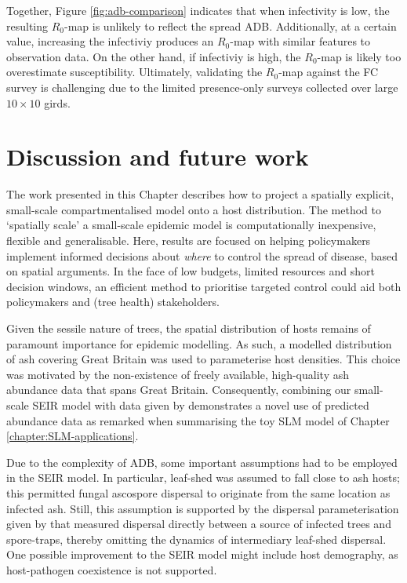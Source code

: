 Together, Figure \ref{fig:adb-comparison} indicates that when infectivity is low, the resulting $R_0$-map is unlikely to reflect the spread ADB. Additionally, at a certain value, increasing the infectiviy produces an $R_0$-map with similar features to observation data. On the other hand, if infectiviy is high, the $R_0$-map is likely too overestimate susceptibility. Ultimately, validating the $R_0$-map against the FC survey is challenging due to the limited presence-only surveys collected over large $10\times 10$ girds.


\section{Discussion and future work}

The work presented in this Chapter describes how to project a spatially explicit, small-scale compartmentalised model onto a host distribution.
The method to `spatially scale' a small-scale epidemic model is computationally inexpensive, flexible and generalisable.
Here, results are focused on helping policymakers implement informed decisions about \textit{where} to control the spread of disease, based on spatial arguments.
In the face of low budgets, limited resources and short decision windows, an efficient method to prioritise targeted control could aid both policymakers and (tree health) stakeholders.

Given the sessile nature of trees, the spatial distribution of hosts remains of paramount importance for epidemic modelling.
As such, a modelled distribution of ash covering Great Britain was used to parameterise host densities.
This choice was motivated by the non-existence of freely available, high-quality ash abundance data that spans Great Britain.
Consequently, combining our small-scale SEIR model with data given by \cite{hill.data} demonstrates a novel use of predicted abundance data\textemdash
as remarked when summarising the toy SLM model of Chapter \ref{chapter:SLM-applications}.

Due to the complexity of ADB, some important assumptions had to be employed in the SEIR model.
In particular, leaf-shed was assumed to fall close to ash hosts; 
this permitted fungal ascospore dispersal to originate from the same location as infected ash.
Still, this assumption is supported by the dispersal parameterisation given by \cite{grosdidier2018tracking} that measured dispersal directly between a source of infected trees and spore-traps, thereby omitting the dynamics of intermediary leaf-shed dispersal.
One possible improvement to the SEIR model might include host demography, as host-pathogen coexistence is not supported.

